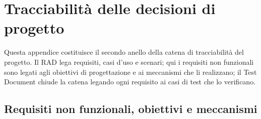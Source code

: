 \chapter{Tracciabilità delle decisioni di progetto}
\label{cap:sdd-app-tracciabilita}

Questa appendice costituisce il secondo anello della catena di tracciabilità
del progetto. Il RAD lega requisiti, casi d'uso e scenari; qui i requisiti non
funzionali sono legati agli obiettivi di progettazione e ai meccanismi che li
realizzano; il Test Document chiude la catena legando ogni requisito ai casi
di test che lo verificano.

\section{Requisiti non funzionali, obiettivi e meccanismi}

